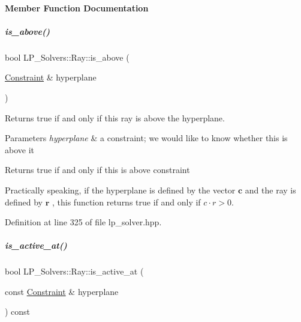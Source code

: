 \paragraph{Member Function Documentation}
\mbox{\label{group___c_l_s_solvers_aec0fb992267a74f098fef5ca6c159cad}} 
\subparagraph{\texorpdfstring{is\+\_\+above()}{is\_above()}}
{\footnotesize\ttfamily bool L\+P\+\_\+\+Solvers\+::\+Ray\+::is\+\_\+above (\begin{DoxyParamCaption}\item[{\hyperlink{group___c_l_s_solvers_class_l_p___solvers_1_1_constraint}{Constraint} \&}]{hyperplane }\end{DoxyParamCaption})\hspace{0.3cm}{\ttfamily [inline]}}



Returns {\ttfamily true} if and only if this ray is above the hyperplane. 


\begin{DoxyParams}{Parameters}
{\em hyperplane} & a constraint; we would like to know whether {\ttfamily this} is above it \\
\hline
\end{DoxyParams}
\begin{DoxyReturn}{Returns}
true if and only if {\ttfamily this} is above {\ttfamily constraint} 
\end{DoxyReturn}
Practically speaking, if the hyperplane is defined by the vector $ \mathbf c $ and the ray is defined by $ \mathbf r $ , this function returns true if and only if $ c\cdot r > 0 $. 

Definition at line 325 of file lp\+\_\+solver.\+hpp.

\mbox{\label{group___c_l_s_solvers_a935fd2cf258315c989cd4edce32371e7}} 
\subparagraph{\texorpdfstring{is\+\_\+active\+\_\+at()}{is\_active\_at()}}
{\footnotesize\ttfamily bool L\+P\+\_\+\+Solvers\+::\+Ray\+::is\+\_\+active\+\_\+at (\begin{DoxyParamCaption}\item[{const \hyperlink{group___c_l_s_solvers_class_l_p___solvers_1_1_constraint}{Constraint} \&}]{hyperplane }\end{DoxyParamCaption}) const\hspace{0.3cm}{\ttfamily [inline]}}



